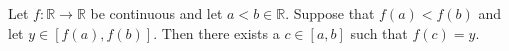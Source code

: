\begin{theorem}
  \label{thm:intermediate_value}
  \leanok

  Let $f : \mathbb{R} → \mathbb{R}$ be continuous and let $a < b ∈ \mathbb{R}$.
  Suppose that $f(a) < f(b)$ and let $y \in [f(a), f(b)]$.
  Then there exists a $c ∈ [a, b]$ such that $f(c) = y$.
\end{theorem}